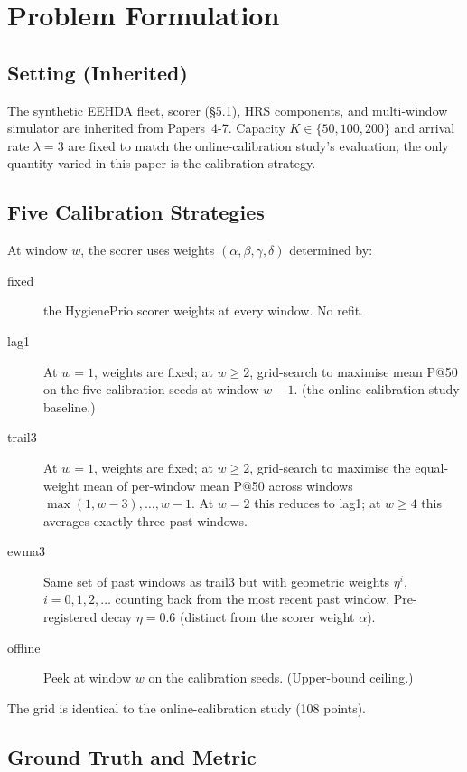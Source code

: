 \section{Problem Formulation}
\label{sec:problem}

\subsection{Setting (Inherited)}

The synthetic EEHDA fleet, scorer (\S5.1), HRS components, and
multi-window simulator are inherited from Papers~4-7. Capacity
$K \in \{50, 100, 200\}$ and arrival rate $\lambda = 3$ are fixed
to match the online-calibration study's evaluation; the only quantity varied in this
paper is the calibration strategy.

\subsection{Five Calibration Strategies}

At window $w$, the scorer uses weights $(\alpha, \beta, \gamma, \delta)$
determined by:

\begin{description}
\item[\textsf{fixed}] the HygienePrio scorer weights at every window. No refit.
\item[\textsf{lag1}] At $w = 1$, weights are \textsf{fixed}; at
$w \geq 2$, grid-search to maximise mean P@50 on the five calibration
seeds at window $w - 1$. (the online-calibration study baseline.)
\item[\textsf{trail3}] At $w = 1$, weights are \textsf{fixed}; at
$w \geq 2$, grid-search to maximise the equal-weight mean of
per-window mean P@50 across windows $\max(1, w - 3), \ldots, w - 1$.
At $w = 2$ this reduces to \textsf{lag1}; at $w \geq 4$ this averages
exactly three past windows.
\item[\textsf{ewma3}] Same set of past windows as \textsf{trail3} but
with geometric weights $\eta^i$, $i = 0, 1, 2, \ldots$ counting back
from the most recent past window. Pre-registered decay $\eta = 0.6$
(distinct from the scorer weight $\alpha$).
\item[\textsf{offline}] Peek at window $w$ on the calibration seeds.
(Upper-bound ceiling.)
\end{description}

The grid is identical to the online-calibration study (108 points).

\subsection{Ground Truth and Metric}

